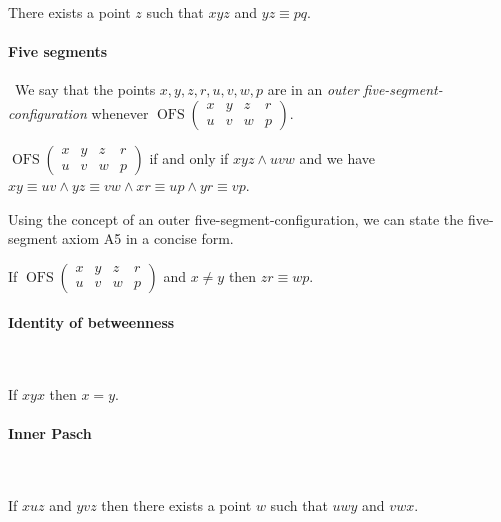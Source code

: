 \documentclass[10pt,a4paper,parskip=half,numbers=endperiod,headings=standardclasses,parskip]{scrbook}
\newcommand{\Cong}[4]{#1 #2 \equiv #3 #4}
\newcommand{\Betw}[3]{#1 #2 #3}
\newcommand{\OFS}[8]{\operatorname{OFS}
\left(\begin{smallmatrix}%
#1 & #2 & #3 & #4 \\
#5 & #6 & #7 & #8
\end{smallmatrix}\right)%
}
\begin{document}
  \begin{forthel}
    \begin{axiom}[A4]
      There exists a point $z$ such that $\Betw{x}{y}{z}$ and $\Cong{y}{z}{p}{q}$.
    \end{axiom}
  \end{forthel}


  \paragraph{Five segments}\
  We say that the points $x,y,z,r,u,v,w,p$ are in an \textit{outer five-segment-configuration}
  whenever $\OFS{x}{y}{z}{r}{u}{v}{w}{p}$.

  \begin{forthel}
    \begin{definition}
      $\OFS{x}{y}{z}{r}{u}{v}{w}{p}$ if and only if
      $\Betw{x}{y}{z}
        \wedge \Betw{u}{v}{w}$
      and we have
      $\Cong{x}{y}{u}{v}
        \wedge \Cong{y}{z}{v}{w}
        \wedge \Cong{x}{r}{u}{p}
        \wedge \Cong{y}{r}{v}{p}$.
    \end{definition}
  \end{forthel}

  Using the concept of an outer five-segment-configuration,
  we can state the five-segment axiom A5 in a concise form.

  \begin{forthel}
    \begin{axiom}[A5]
      If $\OFS{x}{y}{z}{r}{u}{v}{w}{p}$ and $x \neq y$ then $\Cong{z}{r}{w}{p}$.
    \end{axiom}
  \end{forthel}


  \paragraph{Identity of betweenness}\

  \begin{forthel}
    \begin{axiom}[A6]
      If $\Betw{x}{y}{x}$ then $x = y$.
    \end{axiom}
  \end{forthel}


  \paragraph{Inner Pasch}\

  \begin{forthel}
    \begin{axiom}[A7]
      If $\Betw{x}{u}{z}$ and $\Betw{y}{v}{z}$ then there exists a point $w$
      such that $\Betw{u}{w}{y}$ and $\Betw{v}{w}{x}$.
    \end{axiom}
  \end{forthel}
\end{document}
